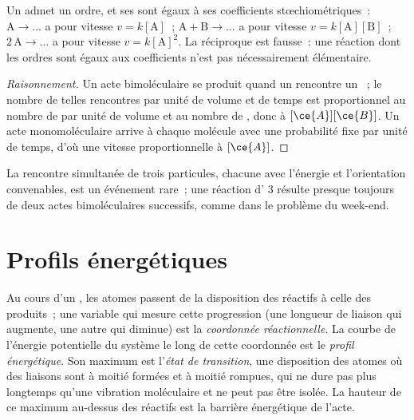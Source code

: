\begin{proposition}\label{prop:b1:elementary-steps:elementary-law}
Un  admet un ordre, et ses  sont égaux à
ses coefficients stœchiométriques~: $\mathrm{A} \to \dots$ a pour
vitesse $v = k[\mathrm{A}]$~;
$\mathrm{A} + \mathrm{B} \to \dots$ a pour vitesse $v = k[\mathrm{A}][\mathrm{B}]$~;
$2\,\mathrm{A} \to \dots$ a pour vitesse $v = k[\mathrm{A}]^2$. La
réciproque est fausse~: une réaction dont les ordres sont égaux aux
coefficients n'est pas nécessairement élémentaire.
\end{proposition}

\begin{proof}[Raisonnement]
Un acte bimoléculaire se produit quand un  rencontre un ~;
le nombre de telles rencontres par unité de volume et de temps est
proportionnel au nombre de  par unité de volume et au nombre de
, donc à
$[\ce{A}][\ce{B}]$. Un acte monomoléculaire arrive à chaque molécule avec
une probabilité fixe par unité de temps, d'où une vitesse
proportionnelle à $[\ce{A}]$.
\end{proof}

\begin{remark}\label{rem:b1:elementary-steps:termolecular}
La rencontre simultanée de trois particules, chacune avec l'énergie et
l'orientation convenables, est un événement rare~; une réaction d' 3 résulte presque toujours de deux actes bimoléculaires
successifs, comme dans le problème du week-end.
\end{remark}

\section{Profils énergétiques}

\begin{definition}\label{def:b1:elementary-steps:energy-profile}
Au cours d'un , les atomes passent de la disposition des
réactifs à celle des produits~; une variable qui mesure cette
progression (une longueur de liaison qui augmente, une autre qui
diminue) est la \emph{coordonnée
réactionnelle}. La courbe de l'énergie potentielle du
système le long de cette coordonnée est le \emph{profil
énergétique}. Son maximum est l'\emph{état de transition},
une disposition des atomes où des liaisons sont à moitié formées et à
moitié rompues, qui ne dure pas plus longtemps qu'une vibration
moléculaire et ne peut pas être isolée. La hauteur de ce maximum
au-dessus des réactifs est la barrière énergétique de l'acte.
\end{definition}

